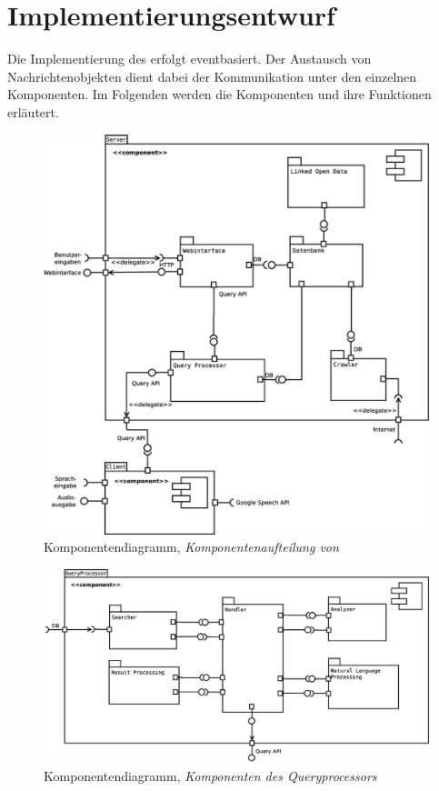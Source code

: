 
\chapter{Implementierungsentwurf}

Die Implementierung des \NewsGenie erfolgt eventbasiert. Der Austausch von
Nachrichtenobjekten dient dabei der Kommunikation unter den einzelnen
Komponenten. Im Folgenden werden die Komponenten und ihre Funktionen erläutert.

\begin{figure}[ht]
\centering
\includegraphics[width=1\textwidth]{Systementwurf/05_implementierungsentwurf/komponenten}
\caption{Komponentendiagramm, \textit{Komponentenaufteilung von \NewsGenie}}
\end{figure}

\begin{figure}[ht]
\centering
\includegraphics[width=1\textwidth]{Systementwurf/05_implementierungsentwurf/paket-queryprocessor}
\caption{Komponentendiagramm, \textit{Komponenten des Queryprocessors}}
\end{figure}

